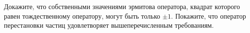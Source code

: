 \documentclass[__main__.tex]{subfiles}
\begin{document}
Докажите, что собственными значениями эрмитова оператора, квадрат которого равен тождественному оператору, могут быть только $\pm 1$. Покажите, что оператор перестановки частиц удовлетворяет вышеперечисленным требованиям.\\ 

\end{document}
